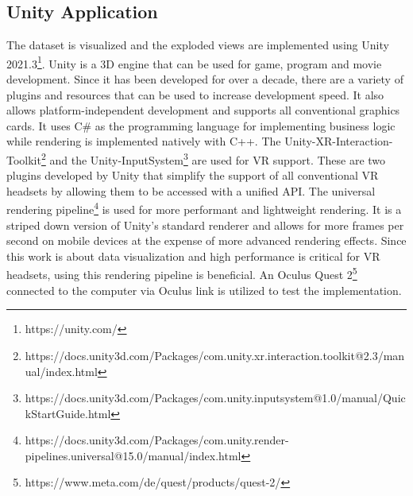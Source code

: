 \subsection{Unity Application}
The dataset is visualized and the exploded views are implemented using Unity 2021.3\footnote{https://unity.com/}.
Unity is a 3D engine that can be used for game, program and movie development. 
Since it has been developed for over a decade, there are a variety of plugins and resources that can be used to increase development speed. 
It also allows platform-independent development and supports all conventional graphics cards. 
It uses C\# as the programming language for implementing business logic while rendering is implemented natively with C++.  
The Unity-XR-Interaction-Toolkit\footnote{https://docs.unity3d.com/Packages/com.unity.xr.interaction.toolkit@2.3/manual/index.html} and the Unity-InputSystem\footnote{https://docs.unity3d.com/Packages/com.unity.inputsystem@1.0/manual/QuickStartGuide.html} are used for VR support.
These are two plugins developed by Unity that simplify the support of all conventional VR headsets by allowing them to be accessed with a unified API.  
The universal rendering pipeline\footnote{https://docs.unity3d.com/Packages/com.unity.render-pipelines.universal@15.0/manual/index.html} is used for more performant and lightweight rendering. It is a striped down version of Unity's standard renderer and allows for more frames per second on mobile devices at the expense of more advanced rendering effects.
Since this work is about data visualization and high performance is critical for VR headsets, using this rendering pipeline is beneficial.
An Oculus Quest 2\footnote{https://www.meta.com/de/quest/products/quest-2/} connected to the computer via Oculus link is utilized to test the implementation.

